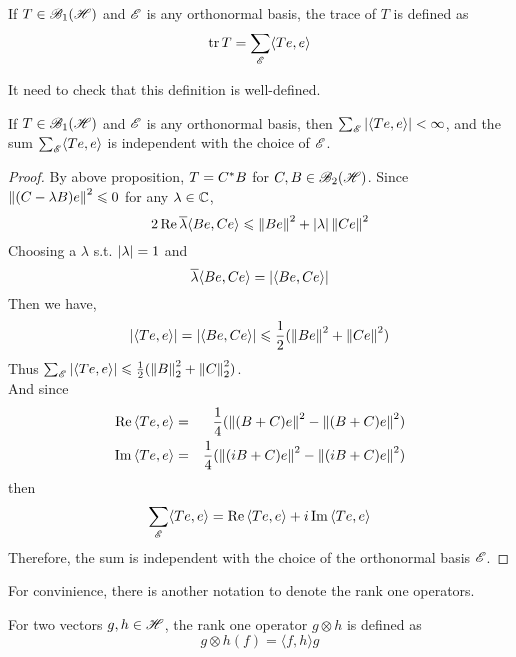 \begin{defn}
	If $T \in \mathscr{B}_{1}\mathscr{(H)}$ and $\mathscr{E}$ is any orthonormal basis, the trace of $T$ is defined as
	\begin{equation*}
		\operatorname{tr}{T} = \sum_{\mathscr{E}} \langle Te,e \rangle
	\end{equation*}
\end{defn}

It need to check that this definition is well-defined.

\begin{prop}
	If $T \in \mathscr{B}_{1}\mathscr{(H)}$ and $\mathscr{E}$ is any orthonormal basis, then $\sum_{\mathscr{E}} \left\lvert\langle Te,e \rangle\right\lvert < \infty$, and the sum $\sum_{\mathscr{E}} \langle Te,e \rangle$ is independent with the choice of $\mathscr{E}$.
\end{prop}
\begin{proof}
	By above proposition, $T = C^{*}B$ for $C,B \in \mathscr{B}_{2}\mathscr{(H)}$. Since $\left\lVert(C-\lambda B)e\right\lVert^2 \leqslant 0$ for any $\lambda \in \mathbb{C}$,
	\begin{equation*}
		2 \operatorname{Re}{\overline{\lambda} \langle Be,Ce \rangle} \leqslant \left\lVert Be\right\lVert^2+\left\lvert\lambda\right\lvert \left\lVert Ce\right\lVert^2
	\end{equation*}
	Choosing a $\lambda$ s.t. $\left\lvert\lambda\right\lvert = 1$ and
	\begin{equation*}
		\overline{\lambda} \langle Be,Ce \rangle = \left\lvert\langle Be,Ce \rangle\right\lvert
	\end{equation*}
	Then we have,
	\begin{equation*}
		\left\lvert\langle Te,e \rangle\right\lvert = \left\lvert\langle Be,Ce \rangle\right\lvert \leqslant \frac{1}{2}(\left\lVert Be\right\lVert^2+\left\lVert Ce\right\lVert^2)
	\end{equation*}
	Thus $\sum_{\mathscr{E}} \left\lvert\langle Te,e \rangle\right\lvert \leqslant \frac{1}{2}(\left\lVert B\right\lVert_2^2+\left\lVert C\right\lVert_2^2)$. \\ 
	And since 
	\begin{eqnarray*}
		\operatorname{Re}{\langle Te,e \rangle} &=& \frac{1}{4} (\left\lVert(B+C)e\right\lVert^2 - \left\lVert(B+C)e\right\lVert^2) \\
		\operatorname{Im}{\langle Te,e \rangle} &=& \frac{1}{4} (\left\lVert(iB+C)e\right\lVert^2 - \left\lVert(iB+C)e\right\lVert^2)
	\end{eqnarray*}
	then
	\begin{equation*}
		\sum_{\mathscr{E}} \langle Te,e \rangle = \operatorname{Re}{\langle Te,e \rangle} + i\operatorname{Im}{\langle Te,e \rangle}
	\end{equation*}
	Therefore, the sum is independent with the choice of the orthonormal basis $\mathscr{E}$.
\end{proof}

For convinience, there is another notation to denote the rank one operators.
\begin{defn}
	For two vectors $g,h \in \mathscr{H}$, the rank one operator $g \otimes h$ is defined as
	\begin{equation*}
		g \otimes h (f) = \langle f,h \rangle g
	\end{equation*}
\end{defn}

